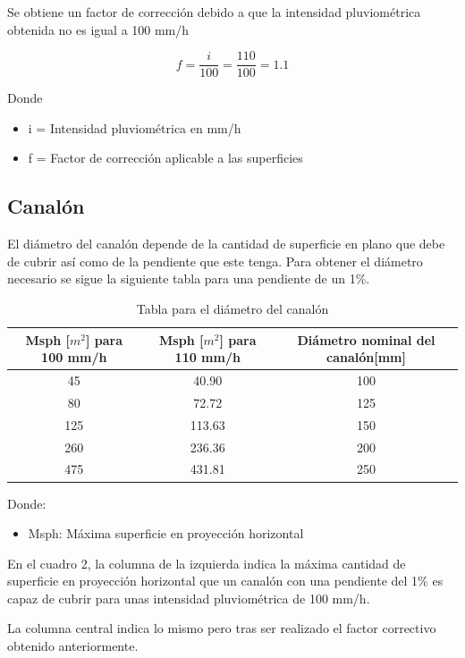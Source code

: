 \documentclass[../main.tex]{subfiles}
\begin{document}
Se obtiene un factor de corrección debido a que la intensidad pluviométrica obtenida no es igual a 100 mm/h

\begin{equation}
    f = \frac{i}{100} = \frac{110}{100} = 1.1
\end{equation}

Donde

\begin{itemize}
    \item i = Intensidad pluviométrica en mm/h
    \item f = Factor de corrección aplicable a las superficies
\end{itemize}

\subsection{Canalón}

El diámetro del canalón depende de la cantidad de superficie en plano que debe de cubrir así como de la pendiente que este tenga. Para obtener el diámetro necesario se sigue la siguiente tabla para una pendiente de un 1\%.

\begin{table}[H]
    \centering
    \begin{tabular}{c|c|c}
         Msph [$m^2$] para 100 mm/h & Msph [$m^2$] para 110 mm/h & Diámetro nominal del canalón[mm] \\ \hline
         45 & 40.90 & 100 \\
         80 & 72.72 & 125 \\
         125 & 113.63 & 150 \\
         260 & 236.36 & 200 \\
         475 & 431.81 & 250 \\
    \end{tabular}
    \caption{Tabla para el diámetro del canalón}
\end{table}

Donde: 
\begin{itemize}
    \item Msph: Máxima superficie en proyección horizontal 
\end{itemize}

En el cuadro 2, la columna de la izquierda indica la máxima cantidad de superficie en proyección horizontal que un canalón con una pendiente del 1\% es capaz de cubrir para unas intensidad pluviométrica de 100 mm/h.

La columna central indica lo mismo pero tras ser realizado el factor correctivo obtenido anteriormente.
\end{document}
